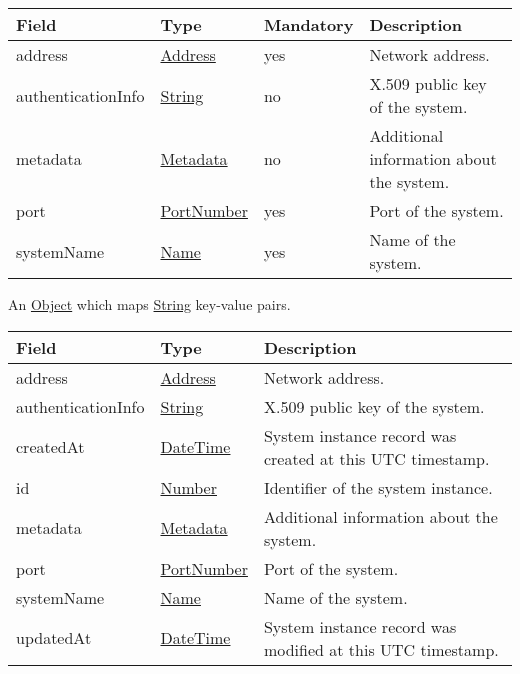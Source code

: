 \documentclass[a4paper]{arrowhead}
\newcommand{\pref}[1]{{\textcolor{ArrowheadGrey}{\hyperref[sec:model:primitives:#1]{#1}}}}
\begin{document}
\label{sec:model:SystemRequest}
 
\begin{table}[ht!]
\begin{tabularx}{\textwidth}{| p{3cm} | p{3cm} | p{2cm} | X |} \hline
\rowcolor{gray!33} Field & Type & Mandatory & Description \\ \hline
address & \pref{Address} & yes & Network address. \\ \hline
authenticationInfo &\pref{String} & no & X.509 public key of the system. \\ \hline
metadata &\hyperref[sec:model:Metadata]{Metadata} & no & Additional information about the system. \\ \hline
port & \pref{PortNumber} & yes & Port of the system. \\ \hline
systemName &\pref{Name} & yes & Name of the system. \\ \hline
\end{tabularx}
\end{table}

\label{sec:model:Metadata}

An \pref{Object} which maps \pref{String} key-value pairs.

 
\begin{table}[ht!]
\begin{tabularx}{\textwidth}{| p{4.25cm} | p{3.5cm} | X |} \hline
\rowcolor{gray!33} Field & Type      & Description \\ \hline
address & \pref{Address} & Network address. \\ \hline
authenticationInfo & \pref{String}     & X.509 public key of the system. \\ \hline
createdAt & \pref{DateTime} & System instance record was created at this UTC time\-stamp. \\ \hline
id & \pref{Number} & Identifier of the system instance. \\ \hline
metadata &\hyperref[sec:model:Metadata]{Metadata} & Additional information about the system. \\ \hline
port & \pref{PortNumber} & Port of the system. \\ \hline
systemName &\pref{Name}  & Name of the system. \\ \hline
updatedAt & \pref{DateTime} & System instance record was modified at this UTC time\-stamp. \\ \hline
\end{tabularx}
\end{table}
\end{document}
